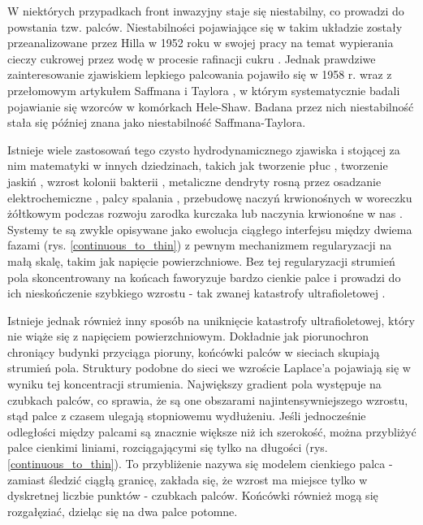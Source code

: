 \documentclass[]{pracamgr}
\begin{document}
      W niektórych przypadkach front inwazyjny staje się niestabilny, co prowadzi do powstania tzw. palców. Niestabilności pojawiające się w takim układzie zostały przeanalizowane przez Hilla w 1952 roku w swojej pracy na temat wypierania cieczy cukrowej przez wodę w procesie rafinacji cukru \cite{hill1952channeling}. Jednak prawdziwe zainteresowanie zjawiskiem lepkiego palcowania pojawiło się w 1958 r. wraz z przełomowym artykułem Saffmana i Taylora \cite{saffman1958penetration}, w którym systematycznie badali pojawianie się wzorców w komórkach Hele-Shaw. Badana przez nich niestabilność stała się później znana jako niestabilność Saffmana-Taylora.

      Istnieje wiele zastosowań tego czysto hydrodynamicznego zjawiska i stojącej za nim matematyki w innych dziedzinach, takich jak tworzenie płuc \cite{clement2012branching,lubkin1995mechanism}, tworzenie jaskiń \cite{szymczak2011initial}, wzrost kolonii bakterii \cite{matsushita1990diffusion}, metaliczne dendryty rosną przez osadzanie elektrochemiczne \cite{brady1984fractal}, palcy spalania \cite{zik1999fingering}, przebudowę naczyń krwionośnych w woreczku żółtkowym podczas rozwoju zarodka kurczaka \cite{nguyen2006dynamics} lub naczynia krwionośne w nas \cite{schneider2012tissue}. Systemy te są zwykle opisywane jako ewolucja ciągłego interfejsu między dwiema fazami (rys. \ref{continuous_to_thin}) z pewnym mechanizmem regularyzacji na małą skalę, takim jak napięcie powierzchniowe. Bez tej regularyzacji strumień pola skoncentrowany na końcach faworyzuje bardzo cienkie palce i prowadzi do ich nieskończenie szybkiego wzrostu - tak zwanej katastrofy ultrafioletowej \cite{shraiman1988singularities}.

      Istnieje jednak również inny sposób na uniknięcie katastrofy ultrafioletowej, który nie wiąże się z napięciem powierzchniowym. Dokładnie jak piorunochron chroniący budynki przyciąga pioruny, końcówki palców w sieciach skupiają strumień pola. Struktury podobne do sieci we wzroście Laplace'a pojawiają się w wyniku tej koncentracji strumienia. Największy gradient pola występuje na czubkach palców, co sprawia, że są one obszarami najintensywniejszego wzrostu, stąd palce z czasem ulegają stopniowemu wydłużeniu. Jeśli jednocześnie odległości między palcami są znacznie większe niż ich szerokość, można przybliżyć palce cienkimi liniami, rozciągającymi się tylko na długości \cite{peterson1998singular,carleson2002laplacian,gubiec2008fingered} (rys. \ref{continuous_to_thin}). To przybliżenie nazywa się modelem cienkiego palca - zamiast śledzić ciągłą granicę, zakłada się, że wzrost ma miejsce tylko w dyskretnej liczbie punktów - czubkach palców. Końcówki również mogą się rozgałęziać, dzieląc się na dwa palce potomne.
\end{document}
